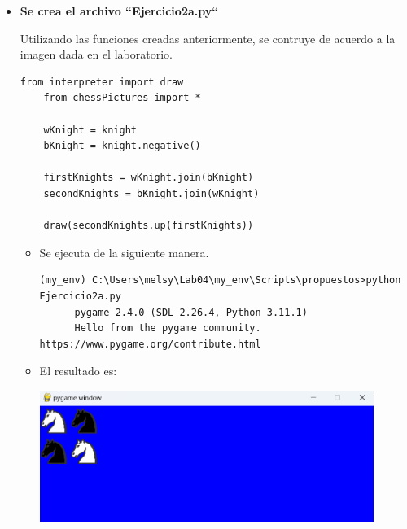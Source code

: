 \documentclass{article}
\begin{document}
  \begin{itemize}
  \item \textbf{Se crea el archivo ``Ejercicio2a.py``}
  
  \vspace{\baselineskip}
  
  Utilizando las funciones creadas anteriormente, se contruye de acuerdo a la imagen dada en el laboratorio.

    \begin{lstlisting}[style=python]
    from interpreter import draw
    from chessPictures import *

    wKnight = knight
    bKnight = knight.negative()

    firstKnights = wKnight.join(bKnight)
    secondKnights = bKnight.join(wKnight)

    draw(secondKnights.up(firstKnights))
    \end{lstlisting}

    \vspace{\baselineskip}

    \begin{itemize}
      \item Se ejecuta de la siguiente manera.

      \begin{lstlisting}[style=shell]
      (my_env) C:\Users\melsy\Lab04\my_env\Scripts\propuestos>python Ejercicio2a.py
      pygame 2.4.0 (SDL 2.26.4, Python 3.11.1)
      Hello from the pygame community. https://www.pygame.org/contribute.html
      \end{lstlisting}

      \vspace{2\baselineskip}

      \item El resultado es:
      
      \vspace{\baselineskip}

      \begin{minipage}{\linewidth}
        \centering
        \includegraphics[width=0.9\textwidth]{imagenes/p_ej2a.png}
      \end{minipage}
    \end{itemize}
  

\end{itemize}
\end{document}

